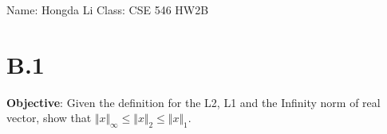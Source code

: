\documentclass[]{article}
\begin{document}
\begin{center}
    Name: Hongda Li \quad Class: CSE 546 \quad HW2B
\end{center}
\section*{B.1}
    \textbf{Objective}: Given the definition for the L2, L1 and the Infinity norm of real vector, show that $\Vert x\Vert_\infty \le \Vert x\Vert_2 \le \Vert x\Vert_1$. 
\end{document}
